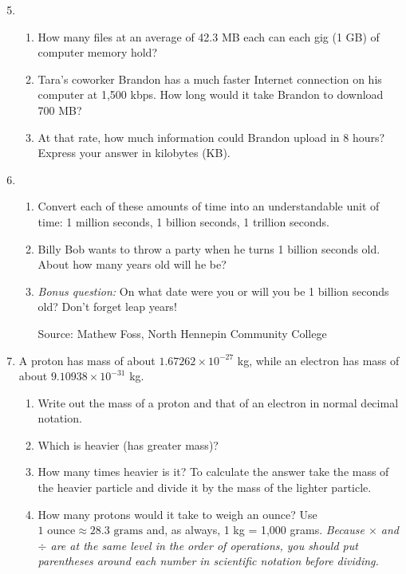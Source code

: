 \begin{enumerate} 
\setcounter{enumi}{4}

\item \begin{enumerate}
\item How many files at an average of 42.3 MB each can each gig (1 GB) of computer memory hold?
\item Tara's coworker Brandon has a much faster Internet connection on his computer at 1,500 kbps.  How long would it take Brandon to download 700 MB?  
\item At that rate, how much information could Brandon upload in 8 hours?  Express your answer in kilobytes (KB).
\end{enumerate}

\item \begin{enumerate}
\item Convert each of these amounts of time into an understandable unit of time: 1 million seconds, 1 billion seconds, 1 trillion seconds. 
\item Billy Bob wants to throw a party when he turns 1 billion seconds old. About how many years old will he be?
\item \emph{Bonus question:}  On what date were you or will you be 1 billion seconds old?  Don't forget leap years! \hfill \begin{footnotesize} Source:  Mathew Foss, North Hennepin Community College \end{footnotesize} %
\end{enumerate}  

\item  A proton has mass of about $1.67262 \times 10^{-27}$ kg, while an electron has mass of about $9.10938 \times 10^{-31}$ kg. 
\begin{enumerate}
\item Write out the mass of a proton and that of an electron in normal decimal notation.
\item Which is heavier (has greater mass)?
\item How many times heavier is it?  To calculate the answer take the mass of the heavier particle and divide it by the mass of the lighter particle.
\item How many protons would it take to weigh an ounce? Use 
$1 \text{ ounce} \approx 28.3 \text{ grams}$
and, as always, 1 kg = 1,000 grams.
\emph{Because $\times$ and $\div$ are at the same level in the order of operations, you should put parentheses around each number in scientific notation before dividing.}
\end{enumerate} %


\end{enumerate}
